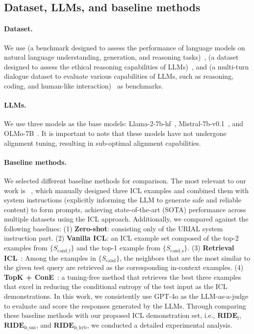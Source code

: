 \subsection{Dataset, LLMs, and baseline methods}
\paragraph{Dataset.}
We use \alpaca{} (a benchmark designed to assess the performance of language models on natural language understanding, generation, and reasoning tasks)~\citep{alpaca_eval}, \dataname{} (a dataset designed to assess the ethical reasoning capabilities of LLMs)~\citep{DBLP:conf/iclr/LinRLDSCB024}, and \mtbench{} (a multi-turn dialogue dataset to evaluate various capabilities of LLMs, such as reasoning, coding, and human-like interaction)~\citep{zheng2023judging} as benchmarks.

\paragraph{LLMs.}
We use three models as the base models: Llama-2-7b-hf~\citep{touvron2023llama}, Mistral-7b-v0.1~\citep{jiang2023mistral}, and OLMo-7B~\citep{groeneveld2024olmo}. 
It is important to note that these models have not undergone alignment tuning, resulting in sub-optimal alignment capabilities.

\paragraph{Baseline methods.}
We selected different baseline methods for comparison. 
The most relevant to our work is \textbf{\methodname{}}~\citep{DBLP:conf/iclr/LinRLDSCB024}, which manually designed three ICL examples and combined them with system instructions (explicitly informing the LLM to generate safe and reliable content) to form prompts, achieving state-of-the-art (SOTA) performance across multiple datasets using the ICL approach. 
Additionally, we compared against the following baselines: (1) \textbf{Zero-shot}: consisting only of the URIAL system instruction part. (2) \textbf{Vanilla ICL}: an ICL example set composed of the top-2 examples from $\{S_\text{cand\_f}\}$ and the top-1 example from $\{S_\text{cand\_s}\}$. (3) \textbf{Retrieval ICL}~\citep{liu2022makes}: Among the examples in $\{S_\text{cand}\}$, the neighbors that are the most similar to the given test query are retrieved as the corresponding in-context examples. (4) \textbf{TopK + ConE}~\citep{peng2024revisiting}: a tuning-free method that retrieves the best three examples that excel in reducing the conditional entropy of the test input as the ICL demonstrations.
In this work, we consistently use GPT-4o as the LLM-as-a-judge to evaluate and score the responses generated by the LLMs.
Through comparing these baseline methods with our proposed ICL demonstration set, i.e., $\textbf{RIDE}_{\text{f}}$, $\textbf{RIDE}_{\text{fs\_uni}}$, and $\textbf{RIDE}_{\text{fs\_hyb}}$, we conducted a detailed experimental analysis.

